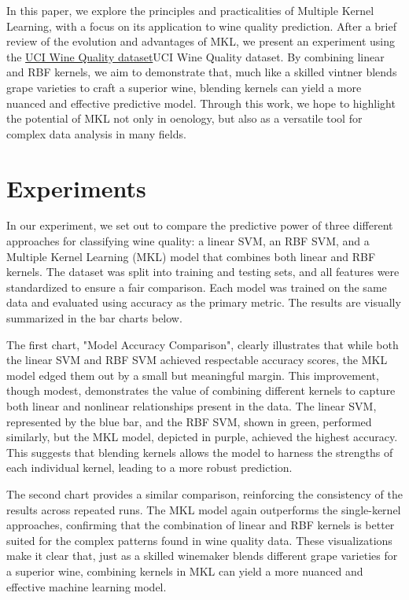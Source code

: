\documentclass[11pt]{article}
\begin{document}
In this paper, we explore the principles and practicalities of Multiple Kernel Learning, with a focus on its application to wine quality prediction. After a brief review of the evolution and advantages of MKL, we present an experiment using the \href{https://archive.ics.uci.edu/dataset/186/wine+quality}{UCI Wine Quality dataset}UCI Wine Quality dataset. By combining linear and RBF kernels, we aim to demonstrate that, much like a skilled vintner blends grape varieties to craft a superior wine, blending kernels can yield a more nuanced and effective predictive model. Through this work, we hope to highlight the potential of MKL not only in oenology, but also as a versatile tool for complex data analysis in many fields.

\section{Experiments}



In our experiment, we set out to compare the predictive power of three different approaches for classifying wine quality: a linear SVM, an RBF SVM, and a Multiple Kernel Learning (MKL) model that combines both linear and RBF kernels. The dataset was split into training and testing sets, and all features were standardized to ensure a fair comparison. Each model was trained on the same data and evaluated using accuracy as the primary metric. The results are visually summarized in the bar charts below.

The first chart, "Model Accuracy Comparison", clearly illustrates that while both the linear SVM and RBF SVM achieved respectable accuracy scores, the MKL model edged them out by a small but meaningful margin. This improvement, though modest, demonstrates the value of combining different kernels to capture both linear and nonlinear relationships present in the data. The linear SVM, represented by the blue bar, and the RBF SVM, shown in green, performed similarly, but the MKL model, depicted in purple, achieved the highest accuracy. This suggests that blending kernels allows the model to harness the strengths of each individual kernel, leading to a more robust prediction.

The second chart provides a similar comparison, reinforcing the consistency of the results across repeated runs. The MKL model again outperforms the single-kernel approaches, confirming that the combination of linear and RBF kernels is better suited for the complex patterns found in wine quality data. These visualizations make it clear that, just as a skilled winemaker blends different grape varieties for a superior wine, combining kernels in MKL can yield a more nuanced and effective machine learning model.
\end{document}
